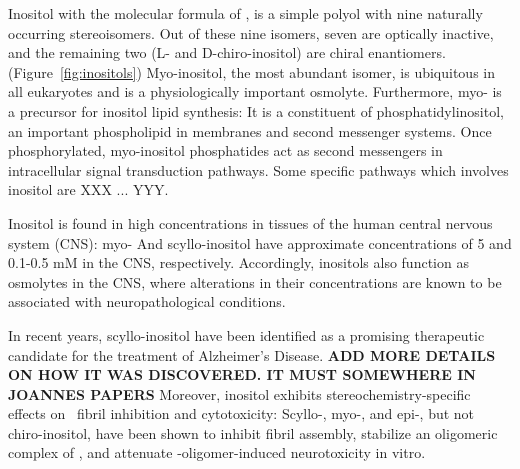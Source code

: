 Inositol with the molecular formula of , is a simple polyol with nine naturally occurring stereoisomers. Out of these nine isomers, seven are optically inactive, and the remaining two (L- and D-chiro-inositol) are chiral enantiomers.(Figure~\ref{fig:inositols}) Myo-inositol, the most abundant isomer, is ubiquitous in all eukaryotes and is a physiologically important osmolyte.  Furthermore, myo- is a precursor for inositol lipid synthesis: It is a constituent of phosphatidylinositol, an important phospholipid in membranes and second messenger systems. Once phosphorylated, myo-inositol phosphatides act as second messengers in intracellular signal transduction pathways.\cite{Fisher:2002tk} Some specific pathways which involves inositol are XXX ... YYY.\cite{That nature paper from 2008 on inositides}

Inositol is found in high concentrations in tissues of the human central nervous system (CNS): myo- And scyllo-inositol have approximate concentrations of 5 and 0.1-0.5 mM in the CNS, respectively.\cite{Fisher:2002tk} Accordingly, inositols also function as osmolytes in the CNS, where alterations in their concentrations are known to be associated with neuropathological conditions.\cite{Michaelis:1993gf, Fisher:2002tk}

In recent years, scyllo-inositol have been identified as a promising therapeutic candidate for the treatment of Alzheimer's Disease. \textbf{ADD MORE DETAILS ON HOW IT WAS DISCOVERED.  IT MUST SOMEWHERE IN JOANNES PAPERS} 
Moreover, inositol exhibits stereochemistry-specific effects on \abeta\  fibril inhibition and cytotoxicity: \cite{McLaurin:2000bq} Scyllo-, myo-, and epi-, but not chiro-inositol, have been shown to inhibit  fibril assembly, stabilize an oligomeric complex of , and attenuate \abeta-oligomer-induced neurotoxicity in vitro. 

